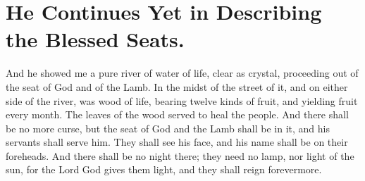 \chapter[Sermon 96. He Continues Yet in Describing the Blessed Seats.]{He Continues Yet in Describing the Blessed Seats.}
\label{sermon:096}

And he showed me a pure river of water of life, clear as crystal, proceeding out of the seat of God and of the Lamb. In the midst of the street of it, and on either side of the river, was wood of life, bearing twelve kinds of fruit, and yielding fruit every month. The leaves of the wood served to heal the people. And there shall be no more curse, but the seat of God and the Lamb shall be in it, and his servants shall serve him. They shall see his face, and his name shall be on their foreheads. And there shall be no night there; they need no lamp, nor light of the sun, for the Lord God gives them light, and they shall reign forevermore.

